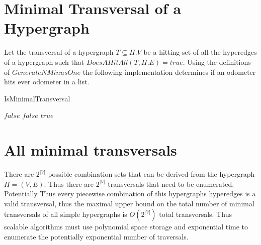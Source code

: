 \section{Minimal Transversal of a Hypergraph}
Let the transversal of a hypergraph $T \subseteq H.V$ be a hitting set of all the hyperedges of a hypergraph such that $DoesAHitAll(T,H.E) = true$. Using the definitions of $GenerateNMinusOne$ the following implementation determines if an odometer hits ever odometer in a list.\\

\begin{algorithm}
	\caption{IsMinimalTransversal}\label{IsMinimalTransversal}
	\begin{algorithmic}[1]
		\State \Return $false$
		\EndIf
		\State \Return $false$
		\EndIf
		\EndFor
		\State \Return $true$
		\EndFunction
	\end{algorithmic}
\end{algorithm}


\section{All minimal transversals}
There are $2^{|V|}$ possible combination sets that can be derived from the hypergraph $H=(V,E)$. Thus there are $2^{|V|}$ transversals that need to be enumerated. Potentially  Thus every piecewise combination of this hypergraphs hyperedges is a valid transversal, thus the maximal upper bound on the total number of minimal transversals of all simple hypergraphs is  $O(2^{|V|})$ total transversals. Thus scalable algorithms must use polynomial space storage and exponential time to enumerate the potentially exponential number of traversals.
